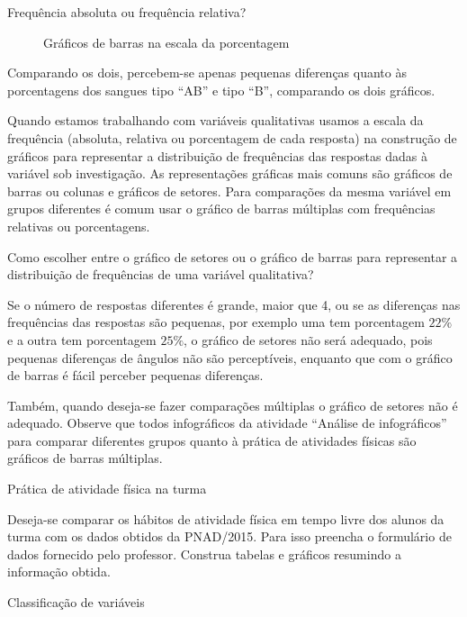 {\begin{example}{Frequência absoluta ou frequência relativa?}
\begin{figure}[H]
\caption{Gráficos de barras na escala da porcentagem}
\label{sangue2}
\end{figure}


Comparando os dois, percebem-se apenas pequenas diferenças quanto às porcentagens dos sangues tipo “AB”{} e tipo “B”, comparando os dois gráficos.

\end{example}

Quando estamos trabalhando com variáveis qualitativas usamos a escala da frequência (absoluta, relativa ou porcentagem de cada resposta) na construção de gráficos para representar a distribuição de frequências das respostas dadas à variável sob investigação. As representações gráficas mais comuns são gráficos de barras ou colunas e gráficos de setores. Para comparações da mesma variável em grupos diferentes é comum usar o gráfico de barras múltiplas com frequências relativas ou porcentagens.

\begin{observation}{}

Como escolher entre o gráfico de setores ou o gráfico de barras para representar a distribuição de frequências de uma variável qualitativa?

Se o número de respostas diferentes é grande, maior que 4, ou se as diferenças nas frequências das respostas são pequenas, por exemplo uma tem porcentagem $22\%$ e a outra tem porcentagem $25\%$, o gráfico de setores não será adequado, pois pequenas diferenças de ângulos não são perceptíveis, enquanto que com o gráfico de barras é fácil perceber pequenas diferenças.

Também, quando deseja-se fazer comparações múltiplas o gráfico de setores não é adequado. Observe que todos infográficos da atividade “Análise de infográficos”{} para comparar diferentes grupos quanto à prática de atividades físicas são gráficos de barras múltiplas.

\end{observation}


\label{est1-prac-1}


\label{est1-ativ-5}
\begin{task}{ Prática de atividade física na turma}

Deseja-se comparar os hábitos de atividade física em tempo livre dos alunos da turma com os dados obtidos da PNAD/2015. Para isso preencha o formulário de dados fornecido pelo professor. Construa tabelas e gráficos resumindo a informação obtida.
\end{task}
\label{est1-ativ-6}
\begin{task}{ Classificação de variáveis}


\end{task}}
